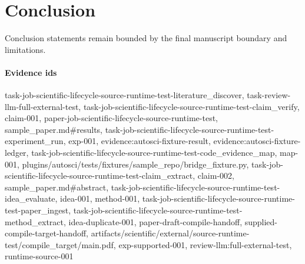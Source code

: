 \section{Conclusion}
Conclusion statements remain bounded by the final manuscript boundary and limitations.

\paragraph{Evidence ids} task-job-scientific-lifecycle-source-runtime-test-literature\_discover, task-review-llm-full-external-test, task-job-scientific-lifecycle-source-runtime-test-claim\_verify, claim-001, paper-job-scientific-lifecycle-source-runtime-test, sample\_paper.md\#results, task-job-scientific-lifecycle-source-runtime-test-experiment\_run, exp-001, evidence:autosci-fixture-result, evidence:autosci-fixture-ledger, task-job-scientific-lifecycle-source-runtime-test-code\_evidence\_map, map-001, plugins/autosci/tests/fixtures/sample\_repo/bridge\_fixture.py, task-job-scientific-lifecycle-source-runtime-test-claim\_extract, claim-002, sample\_paper.md\#abstract, task-job-scientific-lifecycle-source-runtime-test-idea\_evaluate, idea-001, method-001, task-job-scientific-lifecycle-source-runtime-test-paper\_ingest, task-job-scientific-lifecycle-source-runtime-test-method\_extract, idea-duplicate-001, paper-draft-compile-handoff, supplied-compile-target-handoff, artifacts/scientific/external/source-runtime-test/compile\_target/main.pdf, exp-supported-001, review-llm:full-external-test, runtime-source-001
